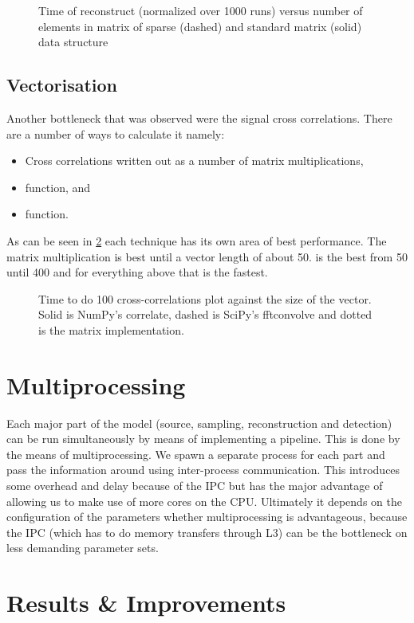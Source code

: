 \documentclass[a4paper, openany, oneside]{memoir}
\begin{document}
\begin{figure}[]
    \centering
    
    \caption{Time of reconstruct (normalized over 1000 runs) versus number of elements in matrix of sparse (dashed) and standard matrix (solid) data structure}
    \label{fig:sparse}
\end{figure}

\subsection{Vectorisation}
\label{sec:vectorisation}
Another bottleneck that was observed were the signal cross correlations. There are a number of ways to calculate it namely:
\begin{itemize}
    \item Cross correlations written out as a number of matrix multiplications,
    \item {}  function, and
    \item {}  function.
\end{itemize}
As can be seen in \cref{fig:sparse} each technique has its own area of best performance. The matrix multiplication is best until a vector length of about 50.   is the best from 50 until 400 and for everything above that  is the fastest.

\begin{figure}[]
    \centering
    
    \caption{Time to do 100 cross-correlations plot against the size of the vector. Solid is NumPy's correlate, dashed is SciPy's fftconvolve and dotted is the matrix implementation.}
    \label{fig:sparse}
\end{figure}

\section{Multiprocessing}
\label{sec:multiprocessing}

Each major part of the model (source, sampling, reconstruction and detection) can be run simultaneously by means of implementing a pipeline. This is done by the means of multiprocessing. We spawn a separate process for each part and pass the information around using inter-process communication. This introduces some overhead and delay because of the IPC but has the major advantage of allowing us to make use of more cores on the CPU. Ultimately it depends on the configuration of the parameters whether multiprocessing is advantageous, because the IPC (which has to do memory transfers through L3) can be the bottleneck on less demanding parameter sets.

\section{Results \& Improvements}
\label{sec:results}
\end{document}
